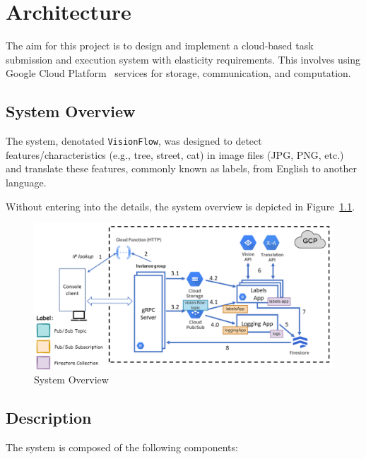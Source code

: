\chapter{Architecture}\label{ch:architecture}

The aim for this project is to design and implement a cloud-based task submission and execution system with elasticity requirements.
This involves using Google Cloud Platform~\cite{google-cloud-platform} services for storage, communication, and computation.


\section{System Overview}\label{sec:system-overview}

The system, denotated \texttt{VisionFlow},
was designed to detect features/characteristics (e.g., tree, street, cat)
in image files (JPG, PNG, etc.) and translate these features, commonly known as labels, from English to another language.

Without entering into the details, the system overview is depicted in Figure~\ref{fig:system-architecture}.

\begin{figure}[!htb]
    \centering
    \includegraphics[width=1\textwidth]{../figures/system-architecture}
    \caption{System Overview}
    \label{fig:system-architecture}
\end{figure}


\section{Description}\label{sec:system-description}

The system is composed of the following components:

